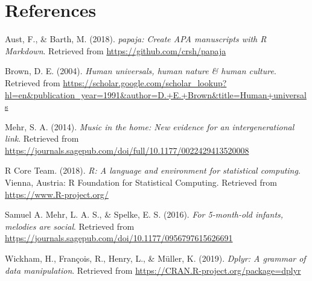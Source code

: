 \documentclass[man]{apa6}
\begin{document}
\section{References}\label{references}

\begingroup
\setlength{\parindent}{-0.5in} \setlength{\leftskip}{0.5in}

\hypertarget{refs}{}
\hypertarget{ref-R-papaja}{}
Aust, F., \& Barth, M. (2018). \emph{papaja: Create APA manuscripts with
R Markdown}. Retrieved from \url{https://github.com/crsh/papaja}

\hypertarget{ref-R-data.table}{}
Brown, D. E. (2004). \emph{Human universals, human nature \& human
culture}. Retrieved from
\url{https://scholar.google.com/scholar_lookup?hl=en\&publication_year=1991\&author=D.+E.+Brown\&title=Human+universals}

\hypertarget{ref-R-pwr}{}
Mehr, S. A. (2014). \emph{Music in the home: New evidence for an
intergenerational link}. Retrieved from
\url{https://journals.sagepub.com/doi/full/10.1177/0022429413520008}

\hypertarget{ref-R-base}{}
R Core Team. (2018). \emph{R: A language and environment for statistical
computing}. Vienna, Austria: R Foundation for Statistical Computing.
Retrieved from \url{https://www.R-project.org/}

\hypertarget{ref-R-summarytools}{}
Samuel A. Mehr, L. A. S., \& Spelke, E. S. (2016). \emph{For 5-month-old
infants, melodies are social}. Retrieved from
\url{https://journals.sagepub.com/doi/10.1177/0956797615626691}

\hypertarget{ref-R-dplyr}{}
Wickham, H., François, R., Henry, L., \& Müller, K. (2019). \emph{Dplyr:
A grammar of data manipulation}. Retrieved from
\url{https://CRAN.R-project.org/package=dplyr}

\endgroup
\end{document}
